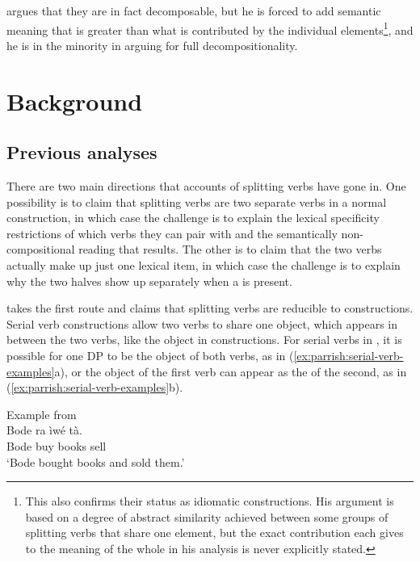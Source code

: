 \documentclass[output=paper]{LSP/langsci}
\begin{document}
\citet{Awoyale1974} argues that they are in fact decomposable, but he is forced to add semantic meaning that is greater than what is contributed by the individual elements\footnote{This also confirms their status as idiomatic constructions. His argument is based on a degree of abstract similarity achieved between some groups of splitting verbs that share one element, but the exact contribution each gives to the meaning of the whole in his analysis is never explicitly stated.}, and he is in the minority in arguing for full decompositionality. 



\section{Background}
\label{sect:background}
\subsection{Previous analyses}
\label{sect:yoruba}

There are two main directions that accounts of splitting verbs have gone in. One possibility is to claim that splitting verbs are two separate verbs in a normal  construction, in which case the challenge is to explain the lexical specificity restrictions of which verbs they can pair with and the semantically non-compositional reading that results. The other is to claim that the two verbs actually make up just one lexical item, in which case the challenge is to explain why the two halves show up separately when a  is present. 

\citet{Bamgbose1966} takes the first route and claims that splitting verbs are reducible to  constructions. Serial verb constructions allow two verbs to share one object, which appears in between the two verbs, like the object in  constructions. For serial verbs in , it is possible for one DP to be the object of both verbs, as in (\ref{ex:parrish:serial-verb-examples}a), or the object of the first verb can appear as the  of the second, as in (\ref{ex:parrish:serial-verb-examples}b). 


\ea
 \ea Example from \citet{Bode2007} \\
    \gll Bode ra \`{i}w\'{e} t\`{a}.\\
    Bode buy books sell\\
    \glt `Bode bought books and sold them.'
\end{document}
